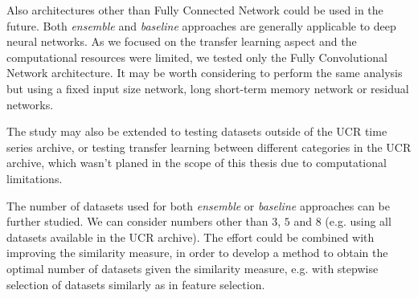 \documentclass[a4paper,11pt,twoside]{report}
\theoremstyle{definition}
\begin{document}
Also architectures other than Fully Connected Network could be used in the future. Both\textit{ ensemble }and\textit{ baseline} approaches are generally applicable to deep neural networks. As we focused on the transfer learning aspect and the computational resources were limited, we tested only the Fully Convolutional Network architecture. It may be worth considering to perform the same analysis but using a fixed input size network, long short-term memory network or residual networks.

The study may also be extended to testing datasets outside of the UCR time series archive,  or testing transfer learning between different categories in the UCR archive, which wasn't planed in the scope of this thesis due to computational limitations.

The number of datasets used for both \textit{ensemble} or \textit{baseline} approaches can be further studied. We can consider numbers other than $3$, $5$ and $8$ (e.g. using all datasets available in the UCR archive). The effort could be combined with improving the similarity measure, in order to develop a method to obtain the optimal number of datasets given the similarity measure, e.g. with stepwise selection of datasets similarly as in feature selection.




\


\thispagestyle{empty}
\end{document}
